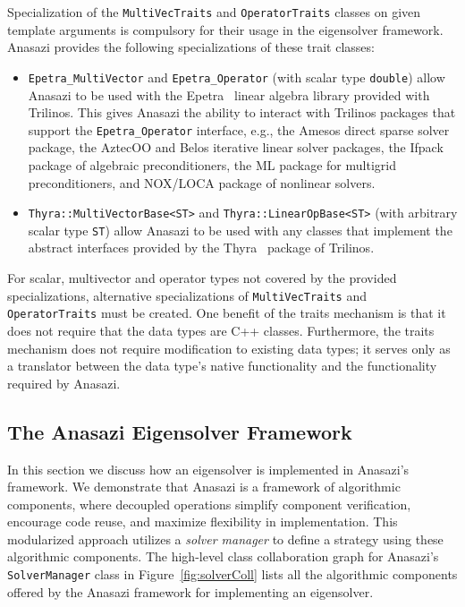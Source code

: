 \documentclass[acmtoms,acmnow]{acmtrans2m}
\newcommand{\aspace}[1]{\texttt{#1}}
\begin{document}
Specialization of the \aspace{MultiVecTraits} and \aspace{OperatorTraits} classes on
given template arguments is compulsory for their usage in the eigensolver framework.
Anasazi provides the following specializations of these trait classes:
\begin{itemize}
  \item \aspace{Epetra\_MultiVector} and \aspace{Epetra\_Operator} (with scalar type
    \aspace{double}) allow Anasazi to be used with the Epetra~\cite{Trilinos:Epetra} linear
    algebra library provided with Trilinos. This gives Anasazi the ability to interact with 
    Trilinos packages that support the \aspace{Epetra\_Operator} interface, e.g., the Amesos direct
    sparse solver package, the AztecOO and Belos iterative linear solver packages, 
    the Ifpack package of algebraic preconditioners, the ML package for multigrid
    preconditioners, and NOX/LOCA package of nonlinear solvers. 
  \item \aspace{Thyra::MultiVectorBase<ST>} and
    \aspace{Thyra::LinearOpBase<ST>} (with arbitrary scalar type
    \aspace{ST}) allow Anasazi to be used with any classes that implement the abstract interfaces
    provided by the Thyra~\cite{Trilinos:Thyra} package of Trilinos.
\end{itemize}
For scalar, multivector and operator types not covered by the provided specializations,
alternative specializations of \aspace{MultiVecTraits} and \aspace{OperatorTraits}
must be created. One benefit of the traits mechanism is that it does
not require that the data types are C++ classes. Furthermore, the traits mechanism
does not require modification to existing data types; it serves only as a translator between
the data type's native functionality and the functionality required by Anasazi.


\subsection{The Anasazi Eigensolver Framework}
\label{subsec:anasazi:solver_framework}

In this section we discuss how an eigensolver is implemented in Anasazi's framework. We
demonstrate that Anasazi is a framework of algorithmic components, where decoupled
operations simplify component verification, encourage code reuse, and maximize flexibility
in implementation. This modularized approach utilizes a \emph{solver manager} to define a
strategy using these algorithmic components. The high-level class collaboration graph for
Anasazi's \aspace{SolverManager} class in Figure~\ref{fig:solverColl} lists all the
algorithmic components offered by the Anasazi framework for implementing an eigensolver.
\end{document}
